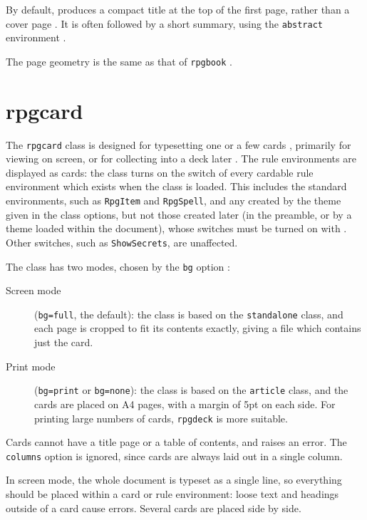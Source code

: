 		By default,  produces a compact title at the top of the first page, rather than a cover page . It is often followed by a short summary, using the \texttt{abstract} environment .

		The page geometry is the same as that of \texttt{rpgbook} .

	\section{rpgcard}\label{S:cardClass}

		The \texttt{rpgcard} class is designed for typesetting one or a few cards , primarily for viewing on screen, or for collecting into a deck later . The rule environments are displayed as cards: the class turns on the switch of every cardable rule environment  which exists when the class is loaded. This includes the standard environments, such as \texttt{RpgItem} and \texttt{RpgSpell}, and any created by the theme given in the class options, but not those created later (in the preamble, or by a theme loaded within the document), whose switches must be turned on with . Other switches, such as \texttt{ShowSecrets}, are unaffected.

		The class has two modes, chosen by the \texttt{bg} option :
		\begin{description}
			\item[Screen mode] (\texttt{bg=full}, the default): the class is based on the \texttt{standalone} class, and each page is cropped to fit its contents exactly, giving a file which contains just the card.
			\item[Print mode] (\texttt{bg=print} or \texttt{bg=none}): the class is based on the \texttt{article} class, and the cards are placed on A4 pages, with a margin of 5pt on each side. For printing large numbers of cards, \texttt{rpgdeck} is more suitable.
		\end{description}

		Cards cannot have a title page or a table of contents, and  raises an error. The \texttt{columns} option is ignored, since cards are always laid out in a single column.

		In screen mode, the whole document is typeset as a single line, so everything should be placed within a card or rule environment: loose text and headings outside of a card cause errors. Several cards are placed side by side.

